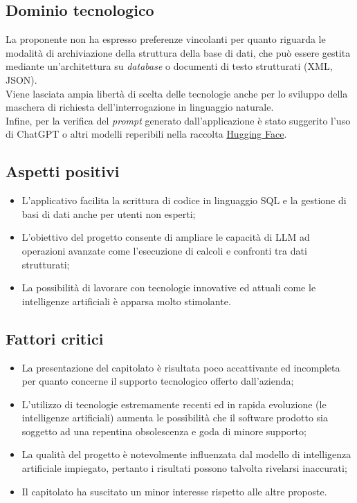 \subsection{Dominio tecnologico}
La proponente non ha espresso preferenze vincolanti per quanto riguarda le modalità di archiviazione della struttura della base di dati, che può essere gestita mediante un'architettura su \textit{database} o documenti di testo strutturati (XML, JSON). \\ Viene lasciata ampia libertà di scelta delle tecnologie anche per lo sviluppo della maschera di richiesta dell'interrogazione in linguaggio naturale. \\ Infine, per la verifica del \textit{prompt} generato dall'applicazione è stato suggerito l'uso di ChatGPT o altri modelli reperibili nella raccolta \href{https://huggingface.co}{Hugging Face}.

\subsection{Aspetti positivi}
\begin{itemize}
    \setlength\itemsep{0em}
    \item L'applicativo facilita la scrittura di codice in linguaggio SQL e la gestione di basi di dati anche per utenti non esperti;
    \item L'obiettivo del progetto consente di ampliare le capacità di LLM ad operazioni avanzate come l'esecuzione di calcoli e confronti tra dati strutturati;
    \item La possibilità di lavorare con tecnologie innovative ed attuali come le intelligenze artificiali è apparsa molto stimolante.
\end{itemize}

\subsection{Fattori critici}
\begin{itemize}
    \setlength\itemsep{0em}
    \item La presentazione del capitolato è risultata poco accattivante ed incompleta per quanto concerne il supporto tecnologico offerto dall'azienda;
    \item L'utilizzo di tecnologie estremamente recenti ed in rapida evoluzione (le intelligenze artificiali) aumenta le possibilità che il software prodotto sia soggetto ad una repentina obsolescenza e goda di minore supporto;
    \item La qualità del progetto è notevolmente influenzata dal modello di intelligenza artificiale impiegato, pertanto i risultati possono talvolta rivelarsi inaccurati;
    \item Il capitolato ha suscitato un minor interesse rispetto alle altre proposte.
\end{itemize}

